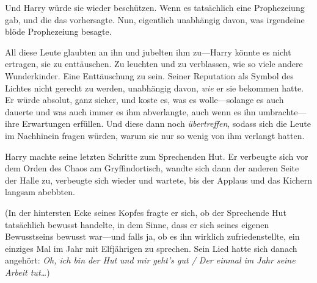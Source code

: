 Und Harry würde sie wieder beschützen. Wenn es tatsächlich eine Prophezeiung gab, und die das vorhersagte. Nun, eigentlich unabhängig davon, was irgendeine blöde Prophezeiung besagte.

All diese Leute glaubten an ihn und jubelten ihm zu—Harry könnte es nicht ertragen, sie zu enttäuschen. Zu leuchten und zu verblassen, wie so viele andere Wunderkinder. Eine Enttäuschung zu sein. Seiner Reputation als Symbol des Lichtes nicht gerecht zu werden, unabhängig davon, \emph{wie} er sie bekommen hatte. Er würde absolut, ganz sicher, und koste es, was es wolle—solange es auch dauerte und was auch immer es ihm abverlangte, auch wenn es ihn umbrachte—ihre Erwartungen erfüllen. Und diese dann noch \emph{übertreffen}, sodass sich die Leute im Nachhinein fragen würden, warum sie nur so wenig von ihm verlangt hatten.


Harry machte seine letzten Schritte zum Sprechenden Hut. Er verbeugte sich vor dem Orden des Chaos am Gryffindortisch, wandte sich dann der anderen Seite der Halle zu, verbeugte sich wieder und wartete, bis der Applaus und das Kichern langsam abebbten.

(In der hintersten Ecke seines Kopfes fragte er sich, ob der Sprechende Hut tatsächlich bewusst handelte, in dem Sinne, dass er sich seines eigenen Bewusstseins bewusst war—und falls ja, ob es ihn wirklich zufriedenstellte, ein einziges Mal im Jahr mit Elfjährigen zu sprechen. Sein Lied hatte sich danach angehört: \emph{Oh, ich bin der Hut und mir geht’s gut / Der einmal im Jahr seine Arbeit tut…})%

